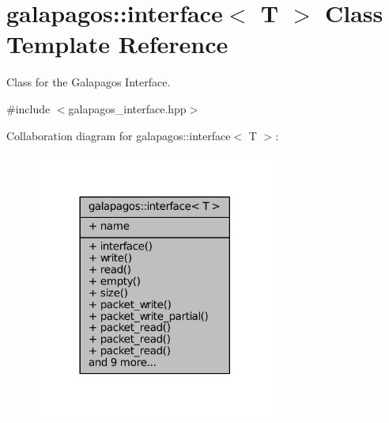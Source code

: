 \hypertarget{classgalapagos_1_1interface}{}\section{galapagos\+:\+:interface$<$ T $>$ Class Template Reference}
\label{classgalapagos_1_1interface}


Class for the Galapagos Interface.  




{\ttfamily \#include $<$galapagos\+\_\+interface.\+hpp$>$}



Collaboration diagram for galapagos\+:\+:interface$<$ T $>$\+:
\nopagebreak
\begin{figure}[H]
\begin{center}
\leavevmode
\includegraphics[width=222pt]{classgalapagos_1_1interface__coll__graph}
\end{center}
\end{figure}
